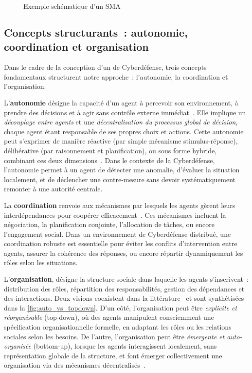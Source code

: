 \begin{figure}[h]
  \centering
  \resizebox{\textwidth}{!}{%
    
  }
  \caption{Exemple schématique d'un SMA}
  \label{fig:sma_illustration}
\end{figure}

\subsection*{Concepts structurants~: autonomie, coordination et organisation}

Dans le cadre de la conception d'un  de Cyberdéfense, trois concepts fondamentaux structurent notre approche~: l'autonomie, la coordination et l'organisation.

L'\textbf{autonomie} désigne la capacité d'un agent à percevoir son environnement, à prendre des décisions et à agir sans contrôle externe immédiat~\cite{Russell2010,Boissier2003}. Elle implique un \textit{découplage entre agents} et une \textit{décentralisation du processus global de décision}, chaque agent étant responsable de ses propres choix et actions. Cette autonomie peut s'exprimer de manière réactive (par simple mécanisme stimulus-réponse), délibérative (par raisonnement et planification), ou sous forme hybride, combinant ces deux dimensions~\cite{Georgeff1987}. Dans le contexte de la Cyberdéfense, l'autonomie permet à un agent de détecter une anomalie, d'évaluer la situation localement, et de déclencher une contre-mesure sans devoir systématiquement remonter à une autorité centrale.

La \textbf{coordination} renvoie aux mécanismes par lesquels les agents gèrent leurs interdépendances pour coopérer efficacement~\cite{Durfee2001, Jennings1996, Sandholm1999}. Ces mécanismes incluent la négociation, la planification conjointe, l'allocation de tâches, ou encore l'engagement social. Dans un environnement de Cyberdéfense distribué, une coordination robuste est essentielle pour éviter les conflits d'intervention entre agents, assurer la cohérence des réponses, ou encore répartir dynamiquement les rôles selon les situations.

L'\textbf{organisation}, désigne la structure sociale dans laquelle les agents s'inscrivent~: distribution des rôles, répartition des responsabilités, gestion des dépendances et des interactions. Deux visions coexistent dans la littérature~\cite{Picard2009reorganisation} et sont synthétisées dans la \autoref{fig:auto_vs_topdown}. D'un côté, l'organisation peut être \emph{explicite et réorganisable} (top-down), où des agents manipulent consciemment une spécification organisationnelle formelle, en adaptant les rôles ou les relations sociales selon les besoins. De l'autre, l'organisation peut être \emph{émergente et auto-organisée} (bottom-up), lorsque les agents interagissent localement, sans représentation globale de la structure, et font émerger collectivement une organisation via des mécanismes décentralisés~\cite{Heylighen1999, DiMarzoSerugendo2006}.

